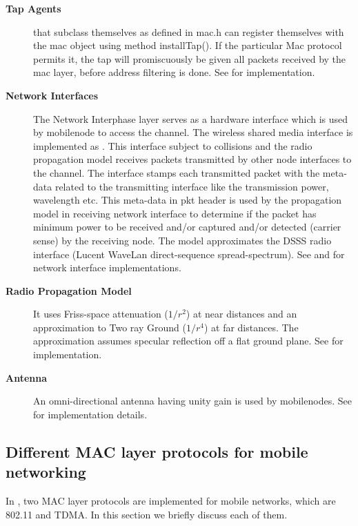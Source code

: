 \begin{description}
\item[{\bf Tap Agents}]  that subclass themselves as
   defined in mac.h can register themselves
  with the mac object using method installTap(). If the particular Mac
  protocol permits it, the tap will promiscuously be 
  given all packets received by the mac layer, before address filtering
  is done. See  for  implementation. 

\item[{\bf Network Interfaces}] The Network Interphase layer serves as
  a hardware interface which is used by mobilenode to access the
  channel. The wireless shared media interface is implemented as
  . This interface
  subject to collisions and the radio propagation model receives
  packets transmitted by other node interfaces to the channel. The
  interface stamps each transmitted packet with the meta-data related
  to the transmitting interface like the transmission power,
  wavelength etc. This meta-data in pkt header is used by the
  propagation model in receiving network interface to determine if the
  packet has minimum power to be received and/or captured and/or
  detected (carrier sense) by the receiving node. The model
  approximates the DSSS radio interface (Lucent WaveLan
  direct-sequence spread-spectrum). See  and
   for network interface implementations.

\item[{\bf Radio Propagation Model}]  It uses Friss-space attenuation
  ($1/r^2$) at near distances and an approximation to Two ray Ground
  ($1/r^4$) at far distances. The approximation assumes specular
  reflection off a flat ground plane. See 
  for implementation.

\item[{\bf Antenna}] An omni-directional antenna having unity gain is 
  used by mobilenodes. See  for implementation
  details. 
\end{description}

\subsection{Different MAC layer protocols for mobile networking}
\label{sec:mobilenode-routing}

In \ns, two MAC layer protocols are implemented for mobile networks,
  which are 802.11 and TDMA.
In this section
  we briefly discuss each of them.

